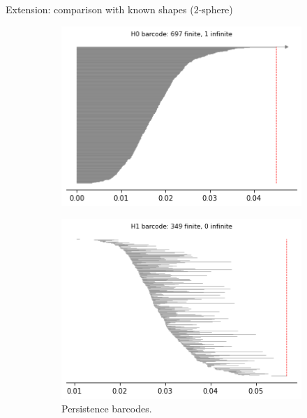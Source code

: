 \documentclass[xcolor={dvipsnames,svgnames}]{beamer}
\begin{document}
\begin{frame}{Extension: comparison with known shapes ($2$-sphere)}
\begin{figure}[H]
\begin{subfigure}[b]{0.25\textwidth}
\end{subfigure}
\begin{subfigure}[b]{0.2\textwidth}
    \includegraphics[width=\textwidth]{figures/dsphere_H0_barcode.png}
    \caption{}
\end{subfigure}
\begin{subfigure}[b]{0.2\textwidth}
    \includegraphics[width=\textwidth]{figures/dsphere_H1_barcode.png}
        \caption{Persistence barcodes.}
\end{subfigure}
\begin{subfigure}[b]{0.2\textwidth}

\end{subfigure}
\end{figure}
\end{frame}
\end{document}
